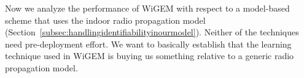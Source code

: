 

Now we analyze the performance of WiGEM with respect to a model-based scheme that uses the indoor radio propagation model (Section~\ref{subsec:handlingidentifiabilityinourmodel}). 
Neither of the techniques need pre-deployment effort. We want to basically establish that
the learning technique used in WiGEM is buying us something relative to a generic radio
propagation model. 

